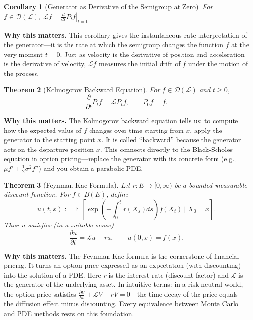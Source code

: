 \documentclass[11pt,a4paper,openany]{book}
\theoremstyle{definition}
\theoremstyle{plain}
\newtheorem{theorem}{Theorem}[chapter]
\newtheorem{corollary}[theorem]{Corollary}
\theoremstyle{remark}
\DeclareMathOperator{\E}{\mathbb{E}}
\newcommand{\1}{\mathbbm{1}}
\newcommand{\calL}{\mathcal{L}}
\newcommand{\calD}{\mathcal{D}}
\begin{document}
\begin{corollary}[Generator as Derivative of the Semigroup at Zero]
For $f \in \calD(\calL)$, $\calL f = \left.\frac{d}{dt} P_{t} f\right|_{t=0}$.
\end{corollary}

\medskip
\noindent\textbf{Why this matters.} This corollary gives the instantaneous-rate interpretation of the generator---it is the rate at which the semigroup changes the function $f$ at the very moment $t=0$. Just as velocity is the derivative of position and acceleration is the derivative of velocity, $\mathcal{L} f$ measures the initial drift of $f$ under the motion of the process.

\begin{theorem}[Kolmogorov Backward Equation]
For $f \in \calD(\calL)$ and $t \geq 0$,
\[
\frac{\partial}{\partial t} P_{t} f = \calL P_{t} f, \qquad P_{0}f = f.
\]
\end{theorem}

\medskip
\noindent\textbf{Why this matters.} The Kolmogorov backward equation tells us: to compute how the expected value of $f$ changes over time starting from $x$, apply the generator to the starting point $x$. It is called ``backward'' because the generator acts on the departure position $x$. This connects directly to the Black-Scholes equation in option pricing---replace the generator with its concrete form (e.g., $\mu f' + \frac{1}{2}\sigma^2 f''$) and you obtain a parabolic PDE.

\begin{theorem}[Feynman-Kac Formula]
Let $r: E \to [0, \infty)$ be a bounded measurable discount function. For $f \in B(E)$, define
\[
u(t, x) := \E\left[\exp\left(-\int_{0}^{t} r(X_{s}) ds\right) f(X_{t}) \mid X_{0} = x\right].
\]
Then $u$ satisfies (in a suitable sense)
\[
\frac{\partial u}{\partial t} = \calL u - r u, \qquad u(0, x) = f(x).
\]
\end{theorem}

\medskip
\noindent\textbf{Why this matters.} The Feynman-Kac formula is the cornerstone of financial pricing. It turns an option price expressed as an expectation (with discounting) into the solution of a PDE. Here $r$ is the interest rate (discount factor) and $\mathcal{L}$ is the generator of the underlying asset. In intuitive terms: in a risk-neutral world, the option price satisfies $\frac{\partial V}{\partial t} + \mathcal{L}V - rV = 0$---the time decay of the price equals the diffusion effect minus discounting. Every equivalence between Monte Carlo and PDE methods rests on this foundation.
\end{document}
